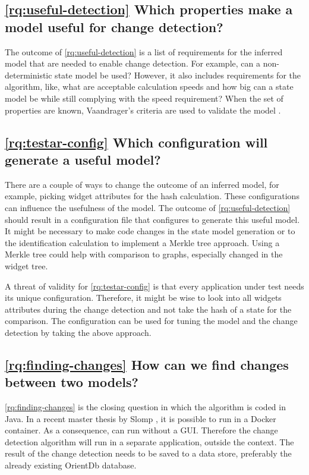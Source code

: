 \subsection{\ref{rq:useful-detection} Which properties make a model useful for change detection?}
The outcome of \ref{rq:useful-detection} is a list of requirements for the inferred model that are needed to enable change detection. For example, can a non-deterministic state model be used? However, it also includes requirements for the algorithm, like, what are acceptable calculation speeds and how big can a state model be while still complying with the speed requirement? When the set of properties are known, Vaandrager's criteria are used to validate the model \cite{vaandrager}.

\subsection{\ref{rq:testar-config} Which \testar configuration will generate a useful model?}
There are a couple of ways to change the outcome of an inferred model, for example, picking widget attributes for the hash calculation. These configurations can influence the usefulness of the model. The outcome of \ref{rq:useful-detection} should result in a \testar configuration file that configures \testar to generate this useful model. It might be necessary to make code changes in the state model generation or to the identification calculation to implement a Merkle tree approach. Using a Merkle tree could help with comparison to graphs, especially changed in the widget tree. 

A threat of validity for \ref{rq:testar-config} is that every application under test needs its unique configuration. Therefore, it might be wise to look into all widgets attributes during the change detection and not take the hash of a state for the comparison. The configuration can be used for tuning the model and the change detection by taking the above approach.

\subsection{\ref{rq:finding-changes} How can we find changes between two models?}
\ref{rq:finding-changes} is the closing question in which the algorithm is coded in Java. In a recent master thesis by Slomp \cite{thesisSlomp}, it is possible to run \testar in a Docker container. As a consequence, \testar can run without a GUI. Therefore the change detection algorithm will run in a separate application, outside the \testar context. The result of the change detection needs to be saved to a data store, preferably the already existing OrientDb database. 

